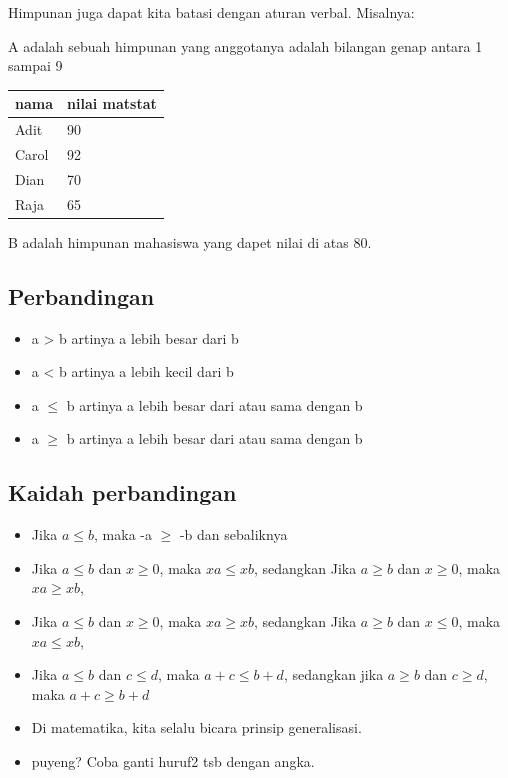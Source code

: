 \documentclass[
  letterpaper,
  DIV=11,
  numbers=noendperiod]{scrartcl}
\providecommand{\tightlist}{%
  \setlength{\itemsep}{0pt}\setlength{\parskip}{0pt}}\usepackage{longtable,booktabs,array}
\begin{document}
Himpunan juga dapat kita batasi dengan aturan verbal. Misalnya:

A adalah sebuah himpunan yang anggotanya adalah bilangan genap antara 1
sampai 9

\begin{longtable}[]{@{}ll@{}}
\toprule\noalign{}
nama & nilai matstat \\
\midrule\noalign{}
\endhead
\bottomrule\noalign{}
\endlastfoot
Adit & 90 \\
Carol & 92 \\
Dian & 70 \\
Raja & 65 \\
\end{longtable}

B adalah himpunan mahasiswa yang dapet nilai di atas 80.

\hypertarget{perbandingan}{%
\subsection{Perbandingan}\label{perbandingan}}

\begin{itemize}
\tightlist
\item
  a \textgreater{} b artinya a lebih besar dari b
\item
  a \textless{} b artinya a lebih kecil dari b
\item
  a \(\leq\) b artinya a lebih besar dari atau sama dengan b
\item
  a \(\geq\) b artinya a lebih besar dari atau sama dengan b
\end{itemize}

\hypertarget{kaidah-perbandingan}{%
\subsection{Kaidah perbandingan}\label{kaidah-perbandingan}}

\begin{itemize}
\item
  Jika \(a \leq b\), maka -a \(\geq\) -b dan sebaliknya
\item
  Jika \(a \leq b\) dan \(x \geq 0\), maka \(xa \leq xb\), sedangkan
  Jika \(a \geq b\) dan \(x \geq 0\), maka \(xa \geq xb\),
\item
  Jika \(a \leq b\) dan \(x \geq 0\), maka \(xa \geq xb\), sedangkan
  Jika \(a \geq b\) dan \(x \leq 0\), maka \(xa \leq xb\),
\item
  Jika \(a \leq b\) dan \(c \leq d\), maka \(a+c \leq b+d\), sedangkan
  jika \(a \geq b\) dan \(c \geq d\), maka \(a+c \geq b+d\)
\item
  Di matematika, kita selalu bicara prinsip generalisasi.
\item
  puyeng? Coba ganti huruf2 tsb dengan angka.
\end{itemize}
\end{document}
